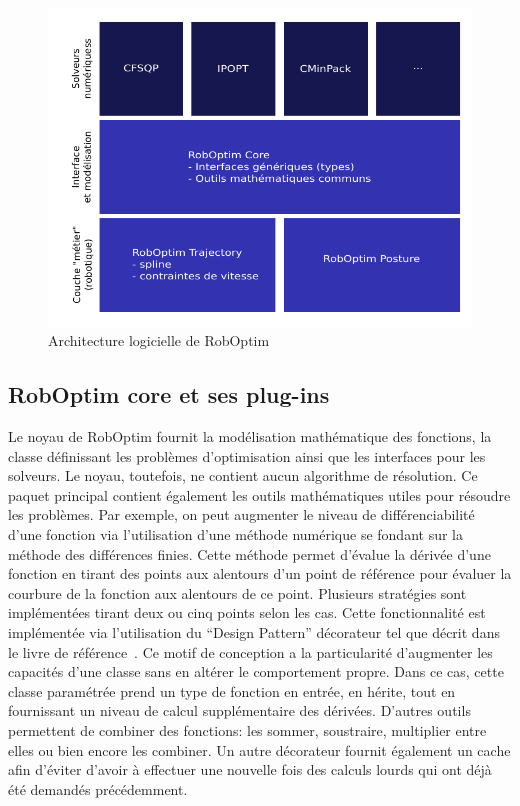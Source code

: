 \begin{figure}
  \begin{center}
    \includegraphics{src/chap1-roboptim/roboptim-architecture.pdf}
  \end{center}
  \caption{Architecture logicielle de RobOptim}
\end{figure}

\subsection{RobOptim core et ses plug-ins}
\label{sec:chap1_roboptim_plugin}

Le noyau de RobOptim fournit la modélisation mathématique des
fonctions, la classe définissant les problèmes d'optimisation ainsi
que les interfaces pour les solveurs. Le noyau, toutefois, ne contient
aucun algorithme de résolution. Ce paquet principal contient également
les outils mathématiques utiles pour résoudre les problèmes. Par
exemple, on peut augmenter le niveau de différenciabilité d'une
fonction via l'utilisation d'une méthode numérique se fondant sur la
méthode des différences finies. Cette méthode permet d'évalue la
dérivée d'une fonction en tirant des points aux alentours d'un point
de référence pour évaluer la courbure de la fonction aux alentours de
ce point. Plusieurs stratégies sont implémentées tirant deux ou cinq
points selon les cas. Cette fonctionnalité est implémentée via
l'utilisation du ``Design Pattern'' décorateur tel que décrit dans le livre de
référence \citep{design.pattern}. Ce motif de conception a la
particularité d'augmenter les capacités d'une classe sans en altérer
le comportement propre. Dans ce cas, cette classe paramétrée prend un
type de fonction en entrée, en hérite, tout en fournissant un niveau
de calcul supplémentaire des dérivées. D'autres outils permettent de
combiner des fonctions: les sommer, soustraire, multiplier entre elles
ou bien encore les combiner. Un autre décorateur fournit également un
cache afin d'éviter d'avoir à effectuer une nouvelle fois des calculs
lourds qui ont déjà été demandés précédemment.

